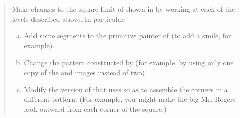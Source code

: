 \begin{quote}
 Make changes to the square limit
of  shown in  by working at each of the levels
described above.  In particular:

\begin{enumerate}[a.]

\item
Add some segments to the primitive  painter of 
(to add a smile, for example).

\item
Change the pattern constructed by  (for example, by using
only one copy of the  and  images instead of
two).

\item
Modify the version of  that uses  so as
to assemble the corners in a different pattern.  (For example, you might make
the big Mr. Rogers look outward from each corner of the square.)

\end{enumerate}
\end{quote}
